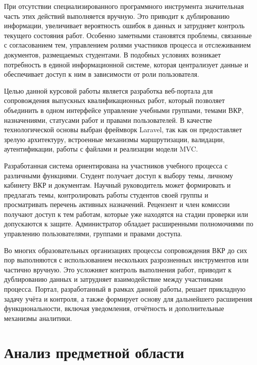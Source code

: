 \documentclass[14pt,a4paper]{extreport}
\begin{document}
При отсутствии специализированного программного инструмента значительная
часть этих действий выполняется вручную.
Это приводит к дублированию информации, увеличивает вероятность ошибок в
данных и затрудняет контроль текущего состояния работ.
Особенно заметными становятся проблемы, связанные с согласованием тем,
управлением ролями участников процесса и отслеживанием документов,
размещаемых студентами.
В подобных условиях возникает потребность в единой информационной системе,
которая централизует данные и обеспечивает доступ к ним в зависимости от
роли пользователя.

Целью данной курсовой работы является разработка веб-портала для
сопровождения выпускных квалификационных работ, который позволяет
объединить в одном интерфейсе управление учебными группами, темами ВКР,
назначениями, статусами работ и правами пользователей.
В качестве технологической основы выбран фреймворк Laravel, так как он
предоставляет зрелую архитектуру, встроенные механизмы маршрутизации,
валидации, аутентификации, работы с файлами и реализации модели MVC.

Разработанная система ориентирована на участников учебного процесса с
различными функциями.
Студент получает доступ к выбору темы, личному кабинету ВКР и документам.
Научный руководитель может формировать и предлагать темы, контролировать
работы студентов своей группы и просматривать перечень активных назначений.
Рецензент и член комиссии получают доступ к тем работам, которые уже
находятся на стадии проверки или допускаются к защите.
Администратор обладает расширенными полномочиями по управлению
пользователями, группами и правами доступа.

Во многих образовательных организациях процессы сопровождения ВКР до сих пор выполняются с использованием нескольких разрозненных инструментов или частично вручную. Это усложняет контроль выполнения работ, приводит к дублированию данных и затрудняет взаимодействие между участниками процесса.
Портал, разработанный в рамках данной работы, решает прикладную задачу
учёта и контроля, а также формирует основу для дальнейшего расширения
функциональности, включая уведомления, отчётность и дополнительные
механизмы аналитики.

\newpage
\chapter[Глава \thechapter. Анализ предметной области]{Анализ предметной области}
\end{document}
